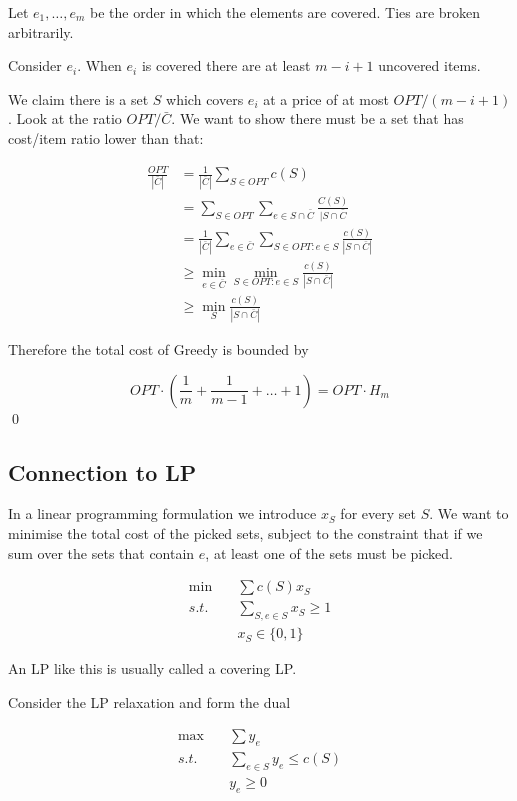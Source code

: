 \begin{pr} Let $e_1,\ldots,e_m$ be the order in which the elements are covered. Ties are broken arbitrarily.

Consider $e_i$. When $e_i$  is covered there are at least $m-i+1$ uncovered items.

We claim there is a set $S$ which covers $e_i$ at a price of at most $OPT/(m-i+1)$. Look at the ratio $OPT/\bar C$. We want to show there must be a set that has cost/item ratio lower than that:

\begin{align*}
\frac{OPT}{|\bar C|} &= \frac{1}{|\bar C|}\sum_{S\in OPT} c(S)\\
	&= \sum_{S\in OPT} \sum_{e\in S\cap \bar C} \frac{C(S)}{|S\cap \bar C}\\
	&= \frac{1}{|\bar C|} \sum_{e\in \bar C} \sum_{S\in OPT: e\in S} \frac{c(S)}{|S\cap \bar C|}\\
	&\geq \min_{e\in \bar C} \min_{S\in OPT:e\in S} \frac{c(S)}{|S\cap \bar C|}\\
	&\geq \min_S \frac{c(S)}{|S\cap \bar C|}
\end{align*}

Therefore the total cost of Greedy is bounded by

\[OPT \cdot (\frac{1}{m} + \frac{1}{m-1} + \ldots + 1) = OPT \cdot H_m\]
\qed \end{pr}

\subsection{Connection to LP}

In a linear programming formulation we introduce $x_S$ for every set $S$. We want to minimise the total cost of the picked sets, subject to the constraint that if we sum over the sets that contain $e$, at least one of the sets must be picked.

\begin{align*}
\min \quad & \sum c(S) x_S\\
s.t. \quad & \sum_{S,e\in S} x_S \geq 1\\
	& x_S \in \{0,1\}
\end{align*}

An LP like this is usually called a covering LP.

Consider the LP relaxation and form the dual

\begin{align*}
\max \quad & \sum y_e\\
s.t. \quad & \sum_{e\in S} y_e \leq c(S)\\
	& y_e \geq 0
\end{align*}

